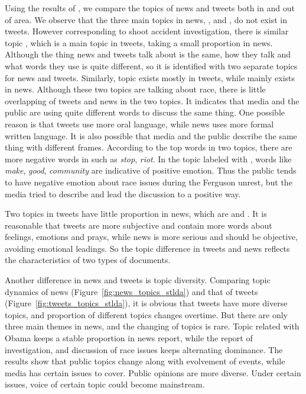Using the results of \stlda, we compare the topics of news and tweets both in and out of \stlouis area. We observe that the three main topics in news, \obamatalk, \shootincident and \raceandcommunity, do not exist in tweets. However corresponding to shoot accident investigation, there is similar topic \michaelbrown, which is a main topic in tweets, taking a small proportion in news. Although the thing news and tweets talk about is the same, how they talk and what words they use is quite different, so it is identified with two separate topics for news and tweets. Similarly, \racism topic exists mostly in tweets, while \raceandcommunity mainly exists in news. Although these two topics are talking about race, there is little overlapping of tweets and news in the two topics. It indicates that media and the public are using quite different words to discuss the same thing. One possible reason is that tweets use more oral language, while news uses more formal written language. It is also possible that media and the public describe the same thing with different frames. According to the top words in two topics, there are more negative words in \racism such as \emph{stop}, \emph{riot}. In the topic labeled with \raceandcommunity, words like \emph{make}, \emph{good}, \emph{community} are indicative of positive emotion. Thus the public tends to have negative emotion about race issues during the Ferguson unrest, but the media tried to describe and lead the discussion to a positive way.

Two topics in tweets have little proportion in news, which are \emotion and \pray. It is reasonable that tweets are more subjective and contain more words about feelings, emotions and prays, while news is more serious and should be objective, avoiding emotional leadings. So the topic difference in tweets and news reflects the characteristics of two types of documents.

Another difference in news and tweets is topic diversity. Comparing topic dynamics of news (Figure~\ref{fig:news_topics_stlda}) and that of tweets (Figure~\ref{fig:tweets_topics_stlda}), it is obvious that tweets have more diverse topics, and proportion of different topics changes overtime. But there are only three main themes in news, and the changing of topics is rare. Topic related with Obama keeps a stable proportion in news report, while the report of investigation, and discussion of race issues keeps alternating dominance. The results show that public topics change along with evolvement of events, while media has certain issues to cover. Public opinions are more diverse. Under certain issues, voice of certain topic could become mainstream.

